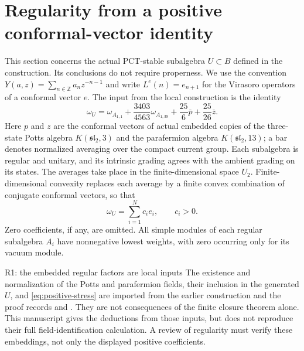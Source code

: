 
\section{Regularity from a positive conformal-vector identity}
\label{sec:regularity}

This section concerns the actual PCT-stable subalgebra $U\subset B$ defined
in the construction. Its conclusions do not require properness. We use
the convention $Y(a,z)=\sum_{n\in\mathbb Z}a_nz^{-n-1}$ and write
$L^e(n)=e_{n+1}$ for the Virasoro operators of a conformal vector $e$.
The input from the local construction is the identity
\begin{equation}
 \omega_U=\omega_{A_{1,1}}
   +\frac{3403}{4563}\omega_{A_{1,39}}
   +\frac{25}{6}\overline p+\frac{25}{26}\overline z.
 \label{eq:positive-stress}
\end{equation}
Here $p$ and $z$ are the conformal vectors of actual embedded copies of
the three-state Potts algebra $K(\mathfrak{sl}_2,3)$ and the parafermion
algebra $K(\mathfrak{sl}_2,13)$; a bar denotes normalized averaging over
the compact current group. Each subalgebra is regular and unitary, and
its intrinsic grading agrees with the ambient grading on its states.
The averages take place in the finite-dimensional space $U_2$.
Finite-dimensional convexity replaces each average by a finite convex
combination of conjugate conformal vectors, so that
\begin{equation}
 \omega_U=\sum_{i=1}^N c_i e_i,\qquad c_i>0.
 \label{eq:finite-positive-stress}
\end{equation}
Zero coefficients, if any, are omitted. All simple modules of each
regular subalgebra $A_i$ have nonnegative lowest weights, with zero
occurring only for its vacuum module.

\begin{reviewnote}{R1: the embedded regular factors are local inputs}
The existence and normalization of the Potts and parafermion fields,
their inclusion in the generated $U$, and
\eqref{eq:positive-stress} are imported from the earlier construction
and the proof records
 and
.
They are not consequences of the finite closure theorem alone.
This manuscript gives the deductions from those inputs, but does not
reproduce their full field-identification calculation. A review of
regularity must verify these embeddings, not only the displayed
positive coefficients.
\end{reviewnote}

